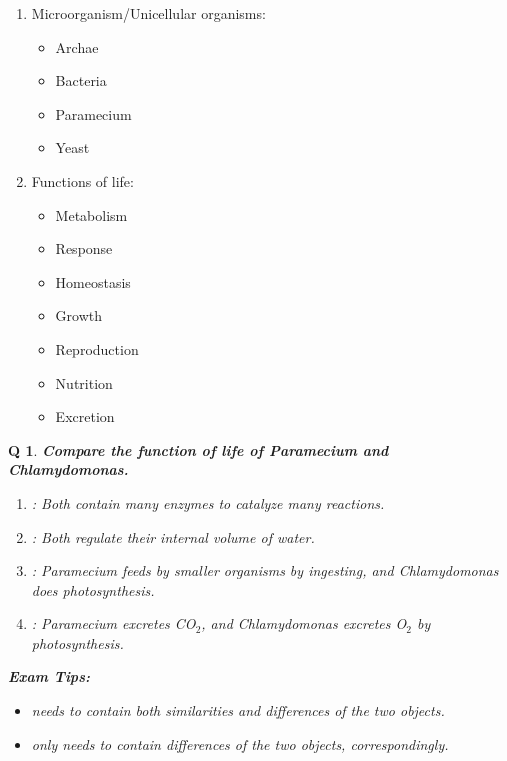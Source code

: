 \documentclass[12pt, a4paper]{article}
\newtheorem{que}{Q}[subsection]
\begin{document}
\begin{enumerate}
    \item Microorganism/Unicellular organisms: 
    \begin{itemize}
        \item Archae
        \item Bacteria
        \item Paramecium
        \item Yeast
    \end{itemize}
    \item Functions of life: 
    \begin{itemize}
        \item Metabolism
        \item Response
        \item Homeostasis
        \item Growth
        \item Reproduction
        \item Nutrition
        \item Excretion
    \end{itemize}
\end{enumerate}
\begin{tcolorbox}\begin{que}
    \textbf{Compare the function of life of \textit{Paramecium} and \textit{Chlamydomonas}.}
    \begin{enumerate}
        \item \textbf{\color{red}{Metabolism}}: Both contain many enzymes to catalyze many reactions. 
        \item \textbf{\color{red}{Homeostasis}}: Both regulate their internal volume of water. 
        \item \textbf{\color{red}{Nutrition}}: \textit{Paramecium} feeds by smaller organisms by ingesting, and \textit{Chlamydomonas} does photosynthesis. 
        \item \textbf{\color{red}{Excretion}}: \textit{Paramecium} excretes CO$_2$, and \textit{Chlamydomonas} excretes O$_2$ by photosynthesis. 
    \end{enumerate}
    \textbf{Exam Tips: }
    \begin{itemize}
        \item \textbf{\color{orange}{Comparison}} needs to contain both similarities and differences of the two objects. 
        \item \textbf{\color{orange}{Distinguish}} only needs to contain differences of the two objects, correspondingly. 
    \end{itemize}
\end{que}\end{tcolorbox}
\end{document}
